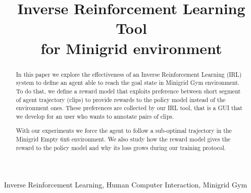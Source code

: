 \documentclass[conference]{IEEEtran}
\begin{document}
\title{Inverse Reinforcement Learning Tool\\for Minigrid environment
}

\author{
}

\maketitle
\begin{abstract}
In this paper we explore the effectiveness of an Inverse Reinforcement Learning (IRL) system to define an agent able to reach the goal state in Minigrid Gym environment.
To do that, we define a reward model that exploits preference between short segment of agent trajectory (clips) to provide rewards to the policy model instead of the environment ones. These preferences are collected by our IRL tool, that is a GUI that we develop for an user who wants to annotate pairs of clips. 

With our experiments we force the agent to follow a sub-optimal trajectory in the Minigrid Empty 6x6 environment. We also study how the reward model gives the reward to the policy model and why its loss grows during our training protocol. 
\end{abstract}

\begin{IEEEkeywords}
Inverse Reinforcement Learning, Human Computer Interaction, Minigrid Gym
\end{IEEEkeywords}





      



\end{document}
